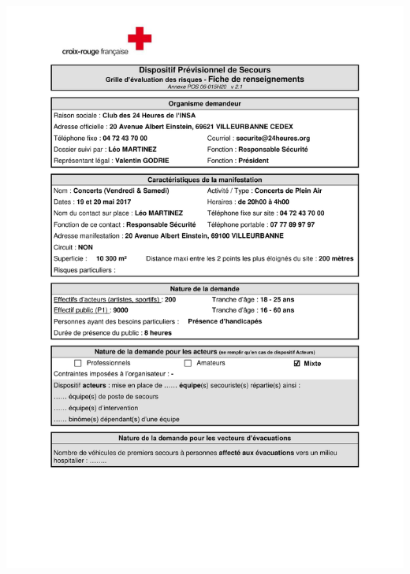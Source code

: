 \documentclass[hidelinks, paper=a4, fontsize=13pt]{report}
\begin{document}
\begin{center}
	\includegraphics[scale=0.70, page=1]{Annexes/Documents/Fiche_RIS_Concerts_VS_2017}
\end{center}
\end{document}
